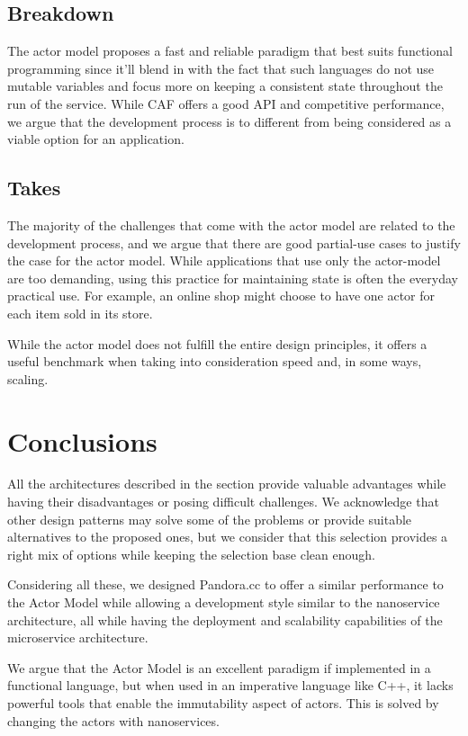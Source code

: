 \subsection*{Breakdown}
The actor model proposes a fast and reliable paradigm that best suits functional programming since it'll blend in with the fact that such languages do not use mutable variables and focus more on keeping a consistent state throughout the run of the service. While CAF offers a good API and competitive performance, we argue that the development process is to different from being considered as a viable option for an application.

\subsection*{Takes}
The majority of the challenges that come with the actor model are related to the development process, and we argue that there are good partial-use cases to justify the case for the actor model. While applications that use only the actor-model are too demanding, using this practice for maintaining state is often the everyday practical use. For example, an online shop might choose to have one actor for each item sold in its store.

While the actor model does not fulfill the entire design principles, it offers a useful benchmark when taking into consideration speed and, in some ways, scaling.


\section{Conclusions}
All the architectures described in the section provide valuable advantages while having their disadvantages or posing difficult challenges. We acknowledge that other design patterns may solve some of the problems or provide suitable alternatives to the proposed ones, but we consider that this selection provides a right mix of options while keeping the selection base clean enough.

Considering all these, we designed Pandora.cc to offer a similar performance to the Actor Model while allowing a development style similar to the nanoservice architecture, all while having the deployment and scalability capabilities of the microservice architecture.

We argue that the Actor Model is an excellent paradigm if implemented in a functional language, but when used in an imperative language like C++, it lacks powerful tools that enable the immutability aspect of actors. This is solved by changing the actors with nanoservices. 

